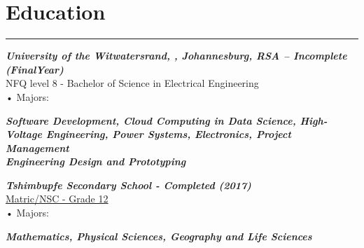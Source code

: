 \documentclass[12pt]{article}
\begin{document}
\vspace{-5mm} \section*{\fontsize{14}{1}\selectfont\color{color_29791}Education}\vspace{-10pt} 
\rule{\textwidth}{0.4pt}
\vspace{2pt}
{\textbf{\textit{\fontsize{12}{1}\selectfont\color{color_29791}University of the Witwatersrand, , Johannesburg, RSA – Incomplete (FinalYear)}}}\\
\fontsize{10}{1}\selectfont\color{color_29791}NFQ level 8 - Bachelor of Science in Electrical Engineering\\
{{\fontsize{10}{1}\selectfont\color{color_29791}\hspace{10mm}• Majors:}}
\parbox{\textwidth}{\raggedright
    \textbf{\textit{\fontsize{8}{1}\selectfont\color{color_29791}Software Development, Cloud Computing in Data Science, High-Voltage Engineering, Power Systems, Electronics, Project Management \\ Engineering Design and Prototyping}}
} \vspace{4pt}
\textbf{\textit{\fontsize{12}{1}\selectfont\color{color_29791}Tshimbupfe Secondary School - Completed (2017)}}\\
\fontsize{10}{1}\selectfont\color{color_29791}\href{https://drive.google.com/file/d/1i5SDy8WoBzwGOmAEAcxJzVyCb1c7Gfqq/view?usp=sharing}{\underline{Matric/NSC - Grade 12}}\\
{{\fontsize{10}{1}\selectfont\color{color_29791}\hspace{10mm}• Majors:}}
\parbox{\textwidth}{\raggedright
    \textbf{\textit{\fontsize{9}{1}\selectfont\color{color_29791}Mathematics, Physical Sciences, Geography and Life Sciences}}
}
\end{document}
